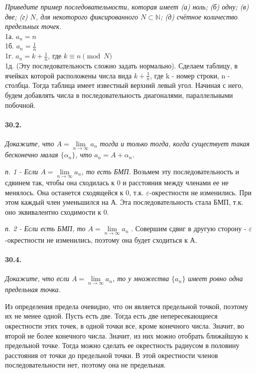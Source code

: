 \documentclass{book}
\begin{document}
\textit{Приведите пример последовательности, которая имеет (а) ноль; (б) одну; (в) две; (г) $N$, для некоторого фиксированного $N \subset \mathbb{N}$; (д) счётное количество предельных точек.} \\
1а. $a_n = n$ \\
1б. $a_n = \frac{1}{n}$ \\
1г. $a_n = k + \frac{1}{n}$, где $k \equiv n \pmod{N}$ \\
1д. (Эту последовательность сложно задать нормально). Сделаем таблицу, в ячейках которой расположены числа вида $k + \frac{1}{n}$, где k - номер строки, n - столбца. Тогда таблица имеет известный верхний левый угол. Начиная с него, будем добавлять числа в последовательность диагоналями, параллельными побочной.

\newpage

\paragraph{30.2.}
\textit{Докажите, что $A = \lim\limits_{n \to \infty} a_ n$ тогда и только тогда, когда существует такая бесконечно малая $\{\alpha_n\}$, что $a_n = A + \alpha_n$.}

\textit{п. 1 - Если  $A = \lim\limits_{n \to \infty} a_ n$, то есть БМП.} 
Возьмем эту последовательность и сдвинем так, чтобы она сходилась к 0 и расстояния между членами ее не менялось. Она останется сходящейся к 0, т.к. $\varepsilon$-окрестности не изменились. При этом каждый член уменьшился на А. Эта последовательность стала БМП, т.к. оно эквивалентно сходимости к 0.

\textit{п. 2 - Если есть БМП, то $A = \lim\limits_{n \to \infty} a_ n$ }. 
Совершим сдвиг в другую сторону - $\varepsilon$-окрестности не изменились, поэтому она будет сходиться к А. 

\paragraph{30.4.}
\textit{Докажите, что если $A = \lim\limits_{n \to \infty} a_ n$, то у множества $\{a_n\}$ имеет ровно одна предельная точка.}

Из определения предела очевидно, что он является предельной точкой, поэтому их не менее одной. Пусть есть две. Тогда есть две непересекающиеся окрестности этих точек, в одной точки все, кроме конечного числа. Значит, во второй не более конечного числа. Значит, из них можно отобрать ближайшую к предельной точке. Тогда можно сделать ее окрестность радиусом в половину расстояния от точки до предельной точки. В этой окрестности членов последовательности нет, поэтому она не предельная.
\end{document}
